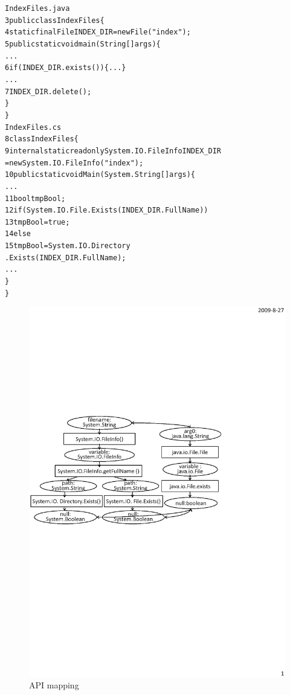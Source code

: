 \begin{CodeOut}\vspace*{-2ex}
\begin{alltt}
                  IndexFiles.java
3 public class IndexFiles \{
4   static final File INDEX_DIR = new File("index");
5   public static void main(String[] args) \{
      ...
6     if (INDEX_DIR.exists()) \{...\}
      ...
7       INDEX_DIR.delete();
    \}
  \}
                  IndexFiles.cs
8 class IndexFiles\{
9   internal static readonly System.IO.FileInfo INDEX_DIR
          = new System.IO.FileInfo("index");
10   public static void  Main(System.String[] args)\{
      ...
11     bool tmpBool;
12     if (System.IO.File.Exists(INDEX_DIR.FullName))
13       tmpBool = true;
14    else
15       tmpBool = System.IO.Directory
                         .Exists(INDEX_DIR.FullName);
      ...
    \}
 \}
\end{alltt}
\end{CodeOut}\vspace*{-2ex}
\begin{figure}[t]
\centering
\includegraphics[scale=0.65,clip]{figure/sample.eps}\vspace*{-1.5ex}
 \caption
{\label{fig:example}API mapping}\vspace*{-2ex}
\end{figure}


